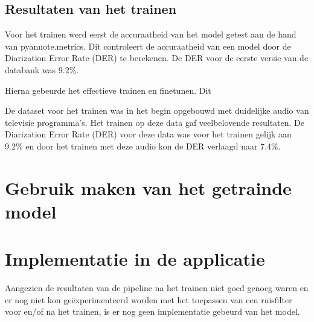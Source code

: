 \subsection{Resultaten van het trainen}
\label{subsec:train-res}



Voor het trainen werd eerst de accuraatheid van het model getest aan de hand van pyannote.metrics. Dit controleert de accuraatheid van een model door de Diarization Error Rate (DER) te berekenen. De DER voor de eerste versie van de databank was 9.2\%.

Hierna gebeurde het effectieve trainen en finetunen. Dit 

De dataset voor het trainen was in het begin opgebouwd met duidelijke audio van televisie programma's. Het trainen op deze data gaf veelbelovende resultaten. De Diarization Error Rate (DER) voor deze data was voor het trainen gelijk aan 9.2\% en door het trainen met deze audio kon de DER verlaagd naar 7.4\%.

\section{Gebruik maken van het getrainde model}
\label{sec:gebruik}

\section{Implementatie in de applicatie}
\label{sec:implementatie}
Aangezien de resultaten van de pipeline na het trainen niet goed genoeg waren en er nog niet kon geëxperimenteerd worden met het toepassen van een ruisfilter voor en/of na het trainen, is er nog geen implementatie gebeurd van het model.
